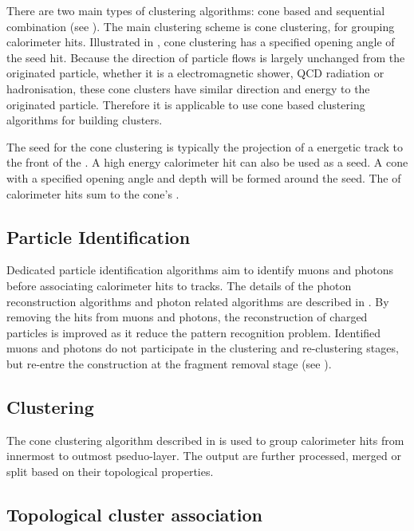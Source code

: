 There are two main types of clustering algorithms: cone based and sequential combination (see \Section{}). The main clustering scheme \pandora is cone clustering, for grouping calorimeter hits. Illustrated in , cone clustering has a specified opening angle of the seed hit. Because the direction of particle flows is largely unchanged from the originated particle, whether it is a electromagnetic shower, QCD radiation or hadronisation, these cone clusters have similar direction and energy to the originated particle. Therefore it is applicable to use cone based clustering algorithms for building clusters.

The seed for the cone clustering is typically the projection of a energetic track to the front of the \ECAL. A high  energy calorimeter hit can also be used as a seed. A cone with a specified opening angle and depth will be formed around the seed. The \fourMomentum of calorimeter hits sum to the cone's \fourMomentum.


\subsection{Particle Identification}
\label{sec:particleID}

Dedicated particle identification algorithms aim to identify muons and photons before associating calorimeter hits to tracks. The details of the photon reconstruction algorithms and photon related algorithms are described in . By removing the hits from muons and photons, the reconstruction of charged particles is improved as it reduce the pattern recognition problem. Identified muons and photons do not participate in the clustering and re-clustering stages, but re-entre the construction at the fragment removal stage (see ).

\subsection{Clustering}

The cone clustering algorithm described in  is used to group calorimeter hits from innermost to outmost pseduo-layer. The output \clusters are further processed, merged or split based on their topological properties.

\subsection{Topological cluster association}

